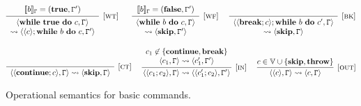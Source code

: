 \begin{figure}[t]
$$
\infer[{[\rname{wt}]}]
{
	\begin{array}{c}
	\conf{\whiles{\textbf{true}}{c},\cstate}
	\\
	 \leadsto \conf{\conf{c};\whiles{b}{c},\cstate'}
	\end{array}
}
{
	\begin{array}{c}
	\eval{b}_{\cstate} = (\textbf{true},\cstate')
	\end{array}
}
~~~~~
\infer[{[\rname{wf}]}]
{
	\begin{array}{c}
	\conf{\whiles{b}{c},\cstate} \\
	\leadsto
	\conf{\textbf{skip},\cstate'}
	\end{array}
}
{
	\begin{array}{c}
	\eval{b}_{\cstate} = (\textbf{false},\cstate')
	\end{array}
}
~~~~
\infer[{[\rname{bk}]}]{
	\begin{array}{c}
	\conf{\conf{\textbf{break};c};\whiles{b}{c'},\cstate} 
	\\
	\leadsto \conf{\textbf{skip},\cstate}
	\end{array}
}{
}
$$

$$
\infer[{[\rname{ct}]}]{
	\begin{array}{c}
	\conf{\conf{\textbf{continue};c},\cstate}
	\leadsto \conf{\textbf{skip},\cstate}
	\end{array}
}{}
~~~~
\infer[{[\rname{in}]}]{\conf{\conf{c_1;c_2},\cstate} \leadsto \conf{\conf{c_1';c_2},\cstate'}}
{
	\begin{array}{c}
	c_1 \not \in \{\textbf{continue},\textbf{break}\}
	\\
	\conf{c_1,\cstate} \leadsto \conf{c_1',\cstate'}
	\end{array}
}
~~~~
\infer[{[\rname{out}]}]{\conf{\conf{c},\cstate} \leadsto \conf{c,\cstate}}{ c \in \mathbb{V} \cup \{\textbf{skip},\textbf{throw}\}}
$$
\caption{Operational semantics for basic commands.}\label{fig:opbasic}
\end{figure}

